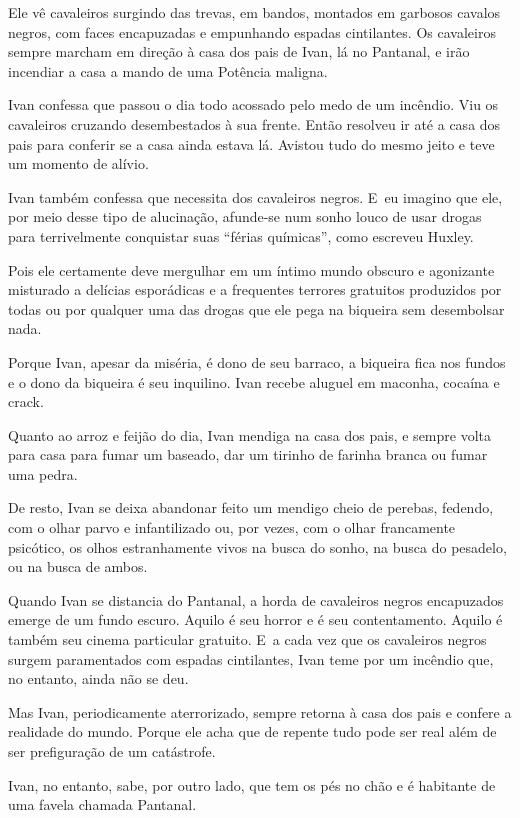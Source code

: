 Ele vê cavaleiros surgindo das trevas, em bandos, montados em garbosos
cavalos negros, com faces encapuzadas e empunhando espadas cintilantes.
Os cavaleiros sempre marcham em direção à casa dos pais de Ivan, lá no
Pantanal, e irão incendiar a casa a mando de uma Potência maligna.

Ivan confessa que passou o dia todo acossado pelo medo de um incêndio.
Viu os cavaleiros cruzando desembestados à sua frente. Então resolveu ir
até a casa dos pais para conferir se a casa ainda estava lá. Avistou
tudo do mesmo jeito e teve um momento de alívio.

Ivan também confessa que necessita dos cavaleiros negros. E~eu imagino
que ele, por meio desse tipo de alucinação, afunde-se num sonho louco de
usar drogas para terrivelmente conquistar suas ``férias químicas'', como
escreveu Huxley.

Pois ele certamente deve mergulhar em um íntimo mundo obscuro e
agonizante misturado a delícias esporádicas e a frequentes terrores
gratuitos produzidos por todas ou por qualquer uma das drogas que ele
pega na biqueira sem desembolsar nada.

Porque Ivan, apesar da miséria, é dono de seu barraco, a biqueira fica
nos fundos e o dono da biqueira é seu inquilino. Ivan recebe aluguel em
maconha, cocaína e crack.

Quanto ao arroz e feijão do dia, Ivan mendiga na casa dos pais, e sempre
volta para casa para fumar um baseado, dar um tirinho de farinha branca
ou fumar uma pedra.

De resto, Ivan se deixa abandonar feito um mendigo cheio de perebas,
fedendo, com o olhar parvo e infantilizado ou, por vezes, com o olhar
francamente psicótico, os olhos estranhamente vivos na busca do sonho,
na busca do pesadelo, ou na busca de ambos.

\asterisc{}

Quando Ivan se distancia do Pantanal, a horda de cavaleiros negros
encapuzados emerge de um fundo escuro. Aquilo é seu horror e é seu
contentamento. Aquilo é também seu cinema particular gratuito. E~a cada
vez que os cavaleiros negros surgem paramentados com espadas
cintilantes, Ivan teme por um incêndio que, no entanto, ainda não se
deu.

Mas Ivan, periodicamente aterrorizado, sempre retorna à casa dos pais e
confere a realidade do mundo. Porque ele acha que de repente tudo pode
ser real além de ser prefiguração de um catástrofe.

Ivan, no entanto, sabe, por outro lado, que tem os pés no chão e é
habitante de uma favela chamada Pantanal.

